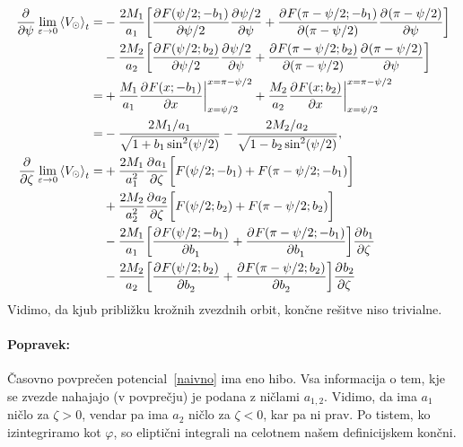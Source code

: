 \documentclass[12pt, a4paper]{article}
\newcommand{\der}[3][]{
    \ensuremath{ \frac{\partial^{#1} #2}{\partial #3^{#1}} }
}
\newcommand{\avgt}[1]{
	\ensuremath{\left\langle #1 \right\rangle_t}
}
\begin{document}
\begin{align}
	\der{}{\psi}\lim_{\varepsilon \to 0}\avgt{V_\odot} = &-\frac{2M_1}{a_1}\bigg[\der{F(\psi/2;-b_1)}{\psi/2}
		\der{\psi/2}{\psi} + \der{F(\pi - \psi/2;-b_1)}{(\pi - \psi/2)}\der{(\pi - \psi/2)}{\psi}\bigg] \notag \\
	&- \frac{2M_2}{a_2}\bigg[\der{F(\psi/2;b_2)}{\psi/2}\der{\psi/2}{\psi} +
		\der{F(\pi - \psi/2;b_2)}{(\pi - \psi/2)}\der{(\pi - \psi/2)}{\psi}\bigg] \notag \\
	= &+ \frac{M_1}{a_1}\der{F(x;-b_1)}{x}\bigg|_{x = \psi/2}^{x = \pi - \psi/2} + \frac{M_2}{a_2}
		\der{F(x;b_2)}{x}\bigg|_{x = \psi/2}^{x = \pi - \psi/2} \notag \\
	= &- \frac{2M_1/a_1}{\sqrt{1 + b_1\sin^2(\psi/2)}} - \frac{2M_2/a_2}{\sqrt{1 - b_2\sin^2(\psi/2)}}, \\
	\der{}{\zeta}\lim_{\varepsilon \to 0} \avgt{V_\odot} = &+\frac{2M_1}{a_1^2}\der{a_1}{\zeta}\bigg[F(\psi/2; -b_1)
		+ F(\pi - \psi/2; -b_1)\bigg] \notag \\
	&+ \frac{2M_2}{a_2^2} \der{a_2}{\zeta}\bigg[F(\psi/2;b_2) + F(\pi - \psi/2;b_2)\bigg] \notag \\
	&- \frac{2M_1}{a_1}\bigg[\der{F(\psi/2;-b_1)}{b_1} +
		\der{F(\pi - \psi/2;-b_1)}{b_1}\bigg]\der{b_1}{\zeta} \notag \\
	&-\frac{2M_2}{a_2}\bigg[\der{F(\psi/2;b_2)}{b_2} +
		\der{F(\pi - \psi/2;b_2)}{b_2}\bigg]\der{b_2}{\zeta}
\end{align}
Vidimo, da kjub pribli\v zku kro\v znih zvezdnih orbit, kon\v cne re\v sitve niso trivialne.

\paragraph{Popravek:}
\v Casovno povpre\v cen potencial~\eqref{naivno} ima eno hibo. Vsa informacija o tem, kje se zvezde
nahajajo (v povpre\v cju) je podana z ni\v clami $a_{1,2}$. Vidimo, da ima $a_1$ ni\v clo za $\zeta > 0$, vendar
pa ima $a_2$ ni\v clo za $\zeta < 0$, kar pa ni prav. Po tistem, ko izintegriramo kot $\varphi$, so elipti\v cni
integrali na celotnem na\v sem definicijskem kon\v cni.
\end{document}
